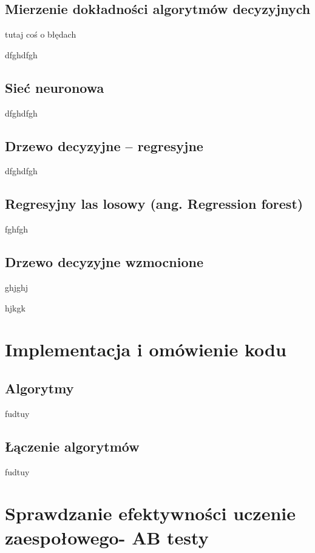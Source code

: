 \documentclass[wmii, inf, mgr]{uwmthesis}
\begin{document}
\section{Mierzenie dokładności algorytmów decyzyjnych}

tutaj coś o błędach

dfghdfgh


\section{Sieć neuronowa}

dfghdfgh


\section{Drzewo decyzyjne – regresyjne}

dfghdfgh

\section{Regresyjny las losowy (ang. Regression forest)}

fghfgh

\section{Drzewo decyzyjne wzmocnione}

ghjghj


hjkgk




\chapter{Implementacja i omówienie kodu}


\section{Algorytmy}
fudtuy


\section{Łączenie algorytmów}
fudtuy



\chapter{Sprawdzanie efektywności uczenie zaespołowego- AB testy}
\end{document}
